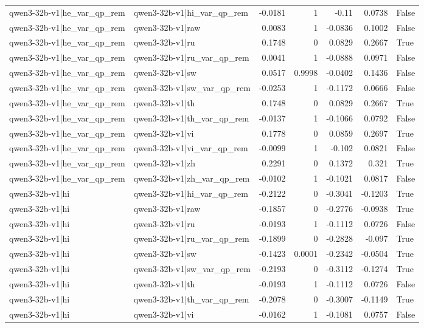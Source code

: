 \begin{table}
\begin{tabular}{l l r r r r l}
qwen3-32b-v1|he_var_qp_rem & qwen3-32b-v1|hi_var_qp_rem & -0.0181 & 1 & -0.11 & 0.0738 & False \\
qwen3-32b-v1|he_var_qp_rem & qwen3-32b-v1|raw & 0.0083 & 1 & -0.0836 & 0.1002 & False \\
qwen3-32b-v1|he_var_qp_rem & qwen3-32b-v1|ru & 0.1748 & 0 & 0.0829 & 0.2667 & True \\
qwen3-32b-v1|he_var_qp_rem & qwen3-32b-v1|ru_var_qp_rem & 0.0041 & 1 & -0.0888 & 0.0971 & False \\
qwen3-32b-v1|he_var_qp_rem & qwen3-32b-v1|sw & 0.0517 & 0.9998 & -0.0402 & 0.1436 & False \\
qwen3-32b-v1|he_var_qp_rem & qwen3-32b-v1|sw_var_qp_rem & -0.0253 & 1 & -0.1172 & 0.0666 & False \\
qwen3-32b-v1|he_var_qp_rem & qwen3-32b-v1|th & 0.1748 & 0 & 0.0829 & 0.2667 & True \\
qwen3-32b-v1|he_var_qp_rem & qwen3-32b-v1|th_var_qp_rem & -0.0137 & 1 & -0.1066 & 0.0792 & False \\
qwen3-32b-v1|he_var_qp_rem & qwen3-32b-v1|vi & 0.1778 & 0 & 0.0859 & 0.2697 & True \\
qwen3-32b-v1|he_var_qp_rem & qwen3-32b-v1|vi_var_qp_rem & -0.0099 & 1 & -0.102 & 0.0821 & False \\
qwen3-32b-v1|he_var_qp_rem & qwen3-32b-v1|zh & 0.2291 & 0 & 0.1372 & 0.321 & True \\
qwen3-32b-v1|he_var_qp_rem & qwen3-32b-v1|zh_var_qp_rem & -0.0102 & 1 & -0.1021 & 0.0817 & False \\
qwen3-32b-v1|hi & qwen3-32b-v1|hi_var_qp_rem & -0.2122 & 0 & -0.3041 & -0.1203 & True \\
qwen3-32b-v1|hi & qwen3-32b-v1|raw & -0.1857 & 0 & -0.2776 & -0.0938 & True \\
qwen3-32b-v1|hi & qwen3-32b-v1|ru & -0.0193 & 1 & -0.1112 & 0.0726 & False \\
qwen3-32b-v1|hi & qwen3-32b-v1|ru_var_qp_rem & -0.1899 & 0 & -0.2828 & -0.097 & True \\
qwen3-32b-v1|hi & qwen3-32b-v1|sw & -0.1423 & 0.0001 & -0.2342 & -0.0504 & True \\
qwen3-32b-v1|hi & qwen3-32b-v1|sw_var_qp_rem & -0.2193 & 0 & -0.3112 & -0.1274 & True \\
qwen3-32b-v1|hi & qwen3-32b-v1|th & -0.0193 & 1 & -0.1112 & 0.0726 & False \\
qwen3-32b-v1|hi & qwen3-32b-v1|th_var_qp_rem & -0.2078 & 0 & -0.3007 & -0.1149 & True \\
qwen3-32b-v1|hi & qwen3-32b-v1|vi & -0.0162 & 1 & -0.1081 & 0.0757 & False \\

\end{tabular}
\end{table}
